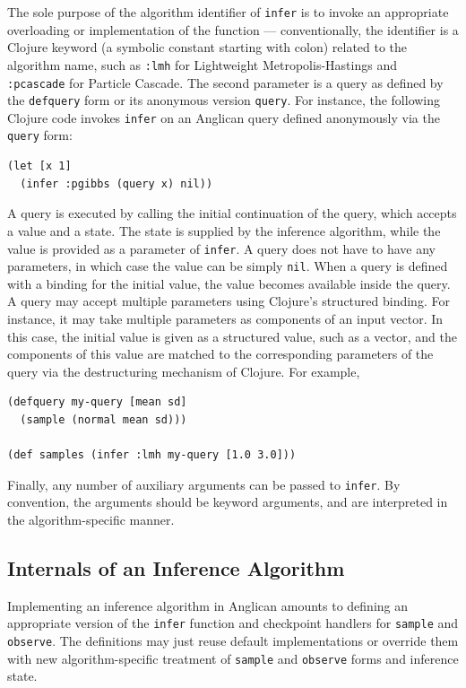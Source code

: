 \documentclass[sigconf]{acmart}
\begin{document}
The sole purpose of the algorithm identifier of \texttt{infer} is to invoke
an appropriate overloading or implementation of the function --- conventionally,
the identifier is a Clojure keyword (a symbolic constant starting with colon)
related to the algorithm name, such as \texttt{:lmh} for Lightweight
Metropolis-Hastings and \texttt{:pcascade} for Particle Cascade.
The second parameter is a query as defined by
the \texttt{defquery} form or its anonymous version \texttt{query}. For instance,
the following Clojure code invokes \texttt{infer} on an Anglican query
defined anonymously via the \texttt{query} form:
\begin{lstlisting}[style=default]
(let [x 1]
  (infer :pgibbs (query x) nil))
\end{lstlisting}
A query is executed by calling the initial continuation of the
query, which accepts a value and a state. The state is supplied
by the inference algorithm, while the value is provided as a
parameter of \texttt{infer}. A query does not have to have any
parameters, in which case the value can be simply \texttt{nil}.
When a query is defined with a binding for the initial value,
the value becomes available inside the query. A query may
accept multiple parameters using Clojure's structured binding.
For instance, it may take multiple parameters as components
of an input vector. In this case, the initial value is given
as a structured value, such as a vector, and the components
of this value are matched to the corresponding
parameters of the query via the destructuring mechanism of Clojure.
For example,
\begin{lstlisting}[style=default]
(defquery my-query [mean sd]
  (sample (normal mean sd)))

(def samples (infer :lmh my-query [1.0 3.0]))
\end{lstlisting}
Finally, any number of auxiliary arguments can be
passed to \texttt{infer}.
By convention, the arguments should be
keyword arguments, and are interpreted in the algorithm-specific
manner.

\subsection{Internals of an Inference Algorithm}
\label{sec:internals}

Implementing an inference algorithm in Anglican amounts to
defining an appropriate version of the \texttt{infer} function
and checkpoint handlers for \texttt{sample} and
\texttt{observe}.  The definitions may just reuse default
implementations or override them with new algorithm-specific
treatment of \texttt{sample} and \texttt{observe} forms and
inference state.
\end{document}
